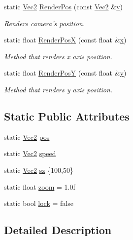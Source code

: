 \begin{DoxyCompactItemize}
static \hyperlink{class_vec2}{Vec2} \hyperlink{class_camera_a4ccd14db8379727d9d70b0fa66fb3b38}{Render\-Pos} (const \hyperlink{class_vec2}{Vec2} \&\hyperlink{_s_d_l__opengl_8h_a10a82eabcb59d2fcd74acee063775f90}{v})
\begin{DoxyCompactList}\small\item\em Renders camera's position. \end{DoxyCompactList}\item 
static float \hyperlink{class_camera_ac4a2de1f750b4369c6651d59ea22a11a}{Render\-Pos\-X} (const float \&\hyperlink{_s_d_l__opengl_8h_ad0e63d0edcdbd3d79554076bf309fd47}{x})
\begin{DoxyCompactList}\small\item\em Method that renders x axis position. \end{DoxyCompactList}\item 
static float \hyperlink{class_camera_adf553fbe1b8f7147d724dfc8f0fdf9c6}{Render\-Pos\-Y} (const float \&\hyperlink{_s_d_l__opengl_8h_a1675d9d7bb68e1657ff028643b4037e3}{y})
\begin{DoxyCompactList}\small\item\em Method that renders y axis position. \end{DoxyCompactList}\end{DoxyCompactItemize}
\subsection*{Static Public Attributes}
\begin{DoxyCompactItemize}
\item 
static \hyperlink{class_vec2}{Vec2} \hyperlink{class_camera_a748c4e2867e34f45a431a1d2dcc6fee2}{pos}
\item 
static \hyperlink{class_vec2}{Vec2} \hyperlink{class_camera_aa0d0a54eb56182723dbd0ce61e0b3e8d}{speed}
\item 
static \hyperlink{class_vec2}{Vec2} \hyperlink{class_camera_a778d16b26445c706637ee754054d5f36}{sz} \{100,50\}
\item 
static float \hyperlink{class_camera_a21fc9e142b104d8e94126657abaa075f}{zoom} = 1.\-0f
\item 
static bool \hyperlink{class_camera_a0b9f6986a66a6ac5477e2beee00f0585}{lock} = false
\end{DoxyCompactItemize}


\subsection{Detailed Description}


